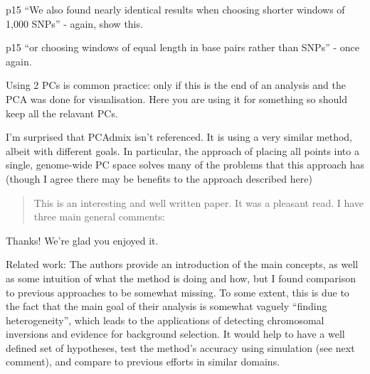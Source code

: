 \begin{point}{p15}
``We also found nearly identical results when choosing shorter windows of 1,000 SNPs'' - again, show this.
\end{point}


\begin{point}{p15}
 ``or choosing windows of equal length in base pairs rather than SNPs'' - once again.
\end{point}


\begin{point}{}
Using 2 PCs is common practice: only if this is the end of an analysis and the
PCA was done for visualisation. Here you are using it for something so should
keep all the relavant PCs.
\end{point}


\begin{point}{}
I'm surprised that PCAdmix isn't referenced. It is using a very similar
method, albeit with different goals. In particular, the approach of placing all
points into a single, genome-wide PC space solves many of the problems that this
approach has (though I agree there may be benefits to the approach described here)
\end{point}



\begin{quote}
    This is an interesting and well written paper. It was a pleasant read. I have three main general
    comments:
\end{quote}

Thanks! We're glad you enjoyed it.

\begin{point}{Related work:} 
The authors provide an introduction of the main concepts, as well as some
intuition of what the method is doing and how, but I found comparison to previous approaches
to be somewhat missing. To some extent, this is due to the fact that the main goal of their
analysis is somewhat vaguely ``finding heterogeneity'', which leads to the applications of
detecting chromosomal inversions and evidence for background selection. It would help to
have a well defined set of hypotheses, test the method’s accuracy  using simulation (see next
comment), and compare to previous efforts in similar domains.
\end{point}

